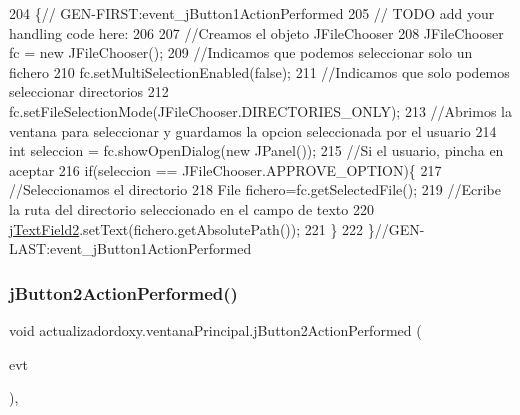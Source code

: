\begin{DoxyCode}
204                                                                          \{\textcolor{comment}{//
      GEN-FIRST:event\_jButton1ActionPerformed}
205         \textcolor{comment}{// TODO add your handling code here:}
206         
207         \textcolor{comment}{//Creamos el objeto JFileChooser}
208         JFileChooser fc = \textcolor{keyword}{new} JFileChooser();
209         \textcolor{comment}{//Indicamos que podemos seleccionar solo un fichero}
210         fc.setMultiSelectionEnabled(\textcolor{keyword}{false});
211         \textcolor{comment}{//Indicamos que solo podemos seleccionar directorios}
212         fc.setFileSelectionMode(JFileChooser.DIRECTORIES\_ONLY);
213         \textcolor{comment}{//Abrimos la ventana para seleccionar y guardamos la opcion seleccionada por el usuario}
214         \textcolor{keywordtype}{int} seleccion = fc.showOpenDialog(\textcolor{keyword}{new} JPanel());
215         \textcolor{comment}{//Si el usuario, pincha en aceptar}
216         \textcolor{keywordflow}{if}(seleccion == JFileChooser.APPROVE\_OPTION)\{
217             \textcolor{comment}{//Seleccionamos el directorio}
218             File fichero=fc.getSelectedFile();
219             \textcolor{comment}{//Ecribe la ruta del directorio seleccionado en el campo de texto}
220             \mbox{\hyperlink{classactualizadordoxy_1_1ventana_principal_a8e245eb8ef04c878fffa2f029094c142}{jTextField2}}.setText(fichero.getAbsolutePath());
221         \}
222     \}\textcolor{comment}{//GEN-LAST:event\_jButton1ActionPerformed}
\end{DoxyCode}
\mbox{\label{classactualizadordoxy_1_1ventana_principal_ad80963b7f354d80ffa69e7e6cadba390}} 
\subsubsection{\texorpdfstring{j\+Button2\+Action\+Performed()}{jButton2ActionPerformed()}}
{\footnotesize\ttfamily void actualizadordoxy.\+ventana\+Principal.\+j\+Button2\+Action\+Performed (\begin{DoxyParamCaption}\item[{java.\+awt.\+event.\+Action\+Event}]{evt }\end{DoxyParamCaption})\hspace{0.3cm}{\ttfamily [inline]}, {\ttfamily [private]}}



